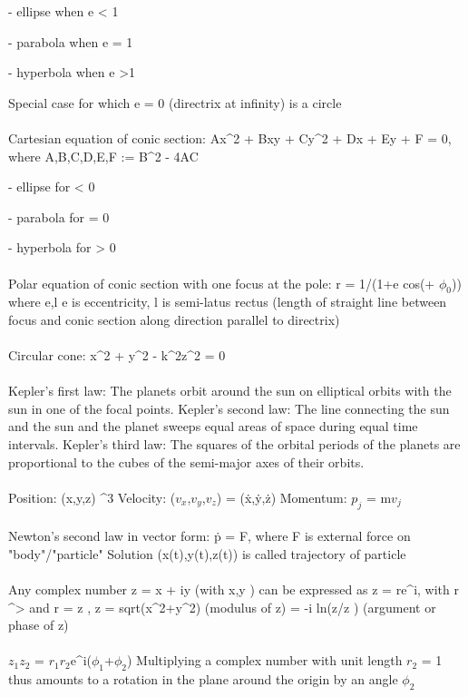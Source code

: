 \documentclass{article}
\begin{document}
- ellipse when \math e < 1\)

- parabola when \math e = 1\)

- hyperbola when \math e >1\)

Special case for which \math e = 0\) (directrix at infinity) is a circle
\\
\\
Cartesian equation of conic section: \math Ax^2 + Bxy + Cy^2 + Dx + Ey + F = 0\), where A,B,C,D,E,F \in \Re  \triangle := B^2 - 4AC\)

- ellipse for \triangle < 0\)

- parabola for \triangle = 0\)

- hyperbola for \triangle > 0\)
\\
\\
Polar equation of conic section with one focus at the pole: \math r = 1/(1+e cos(\phi + $\phi_0$))\) where \math e,l \in \Re e\) is eccentricity, \math l\) is semi-latus rectus (length of straight line between focus and conic section along direction parallel to directrix)
\\
\\
Circular cone: \math x^2 + y^2 - k^2z^2 = 0\)
\\
\\
Kepler's first law: The planets orbit around the sun on elliptical orbits with the sun in one of the focal points.
\newline Kepler's second law: The line connecting the sun and the sun and the planet sweeps equal areas of space during equal time intervals.
\newline Kepler's third law: The squares of the orbital periods of the planets are proportional to the cubes of the semi-major axes of their orbits.
\\
\\
Position: \math (x,y,z) \in \Re^3\)
\newline Velocity: \math ($v_x$,$v_y$,$v_z$) = (\.{x},\.{y},\.{z})\)
\newline Momentum: \math $p_j$ = m$v_j$
\\
\\
Newton's second law in vector form: \.{p} = F\), where F is external force on "body"/"particle"
\newline Solution \math (x(t),y(t),z(t))\) is called trajectory of particle
\\
\\
Any complex number \math z = x + iy\) (with \math x,y \in \Re\)) can be expressed as \math z = re^i\theta\), with \math r \in \Re^>\) and \phi \in \Re
\newline r = \vert z \vert, \vert z \vert = \math sqrt(x^2+y^2)\) (modulus of z)
\newline \phi = -i ln(z/\vert z \vert)\) (argument or phase of z)
\\
\\
\math $z_1$$z_2$ = $r_1$$r_2$e^i($\phi_1$+$\phi_2$)\)
\newline Multiplying a complex number with unit length $r_2$ = 1 thus amounts to a rotation in the plane around the origin by an angle $\phi_2$ \)
\end{document}
